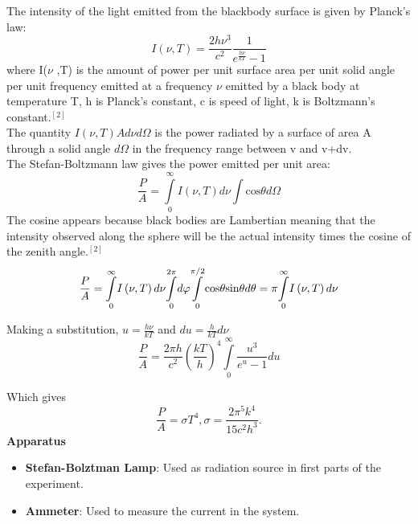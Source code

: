 \documentclass[10pt,a4paper]{article}
\begin{document}
{\par The intensity of the light emitted from the blackbody surface is given by Planck's law:
\begin{equation}
I\left(\nu ,T\right)=\frac{2h{\nu }^{3}}{{c}^{2}}\frac{1}{{e}^{\frac{h\nu}{kT}}-1}
\end{equation}
where I($\nu$ ,T) is the amount of power per unit surface area per unit solid angle per unit frequency emitted at a frequency $\nu$ emitted by a black body at temperature T, h is Planck's constant, c is speed of light, k is Boltzmann's constant.$^{[2]}$\\
The quantity $I(\nu,T)Ad\nu d\Omega$ is the power radiated by a surface of area A through a solid angle $d\Omega$ in the frequency range between v and v+dv.\\
The Stefan-Boltzmann law gives the power emitted per unit area:
\begin{equation}
\frac{P}{A}=\underset{0}{\overset{\infty }{\int }}I\left(\nu ,T\right)d\nu \int \mathrm{cos}\theta d\Omega
\end{equation}
The cosine appears because black bodies are Lambertian meaning that the intensity observed along the sphere will be the actual intensity times the cosine of the zenith angle.$^{[2]}$
\begin{equation}
\frac{P}{A}=\underset{0}{\overset{\infty }{\int }}I\left(\nu ,T\right)d\nu \underset{0}{\overset{2\pi }{\int }}d\varphi \underset{0}{\overset{\pi/2}{\int }}{\mathrm{cos}}\theta \mathrm{sin}\theta d\theta \\= \pi\underset{0}{\overset{\infty }{\int }}I\left(\nu ,T\right)d\nu
\end{equation} 
\par Making a substitution, $u=\frac{h\nu}{kT}$ and $du=\frac{h}{kT}d\nu$
\begin{equation}
\frac{P}{A}=\frac{2\pi h}{{c}^{2}}{\left(\frac{kT}{h}\right)}^{4}\underset{0}{\overset{\infty }{\int }}\frac{{u}^{3}}{{e}^{u}-1}du
\end{equation}
\par Which gives
\begin{equation}
\frac{P}{A}=\sigma T^4, \sigma=\frac{2\pi^5k^4}{15c^2h^3}.
\end{equation}
\textbf{Apparatus}
\\[\baselineskip]
\begin{itemize}
	\item \textbf{Stefan-Bolztman Lamp}: Used as radiation source in first parts of the experiment.
	\item \textbf{Ammeter}: Used to measure the current in the system.

\end{itemize}}
\end{document}

